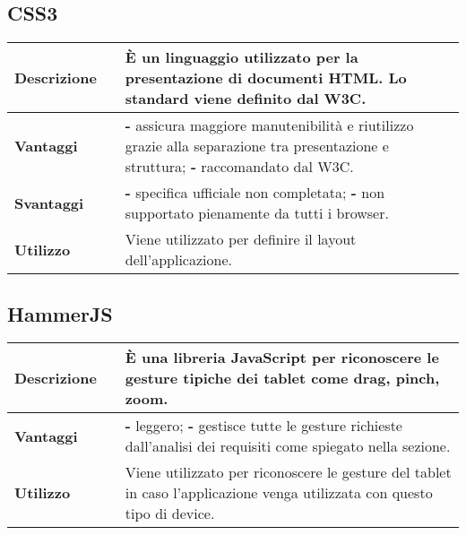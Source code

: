 \subsection{CSS3}
\label{CSS3}
\begin{table}[H]
	\centering
	\begin{tabular}{p{2cm}p{0.5cm}p{11.5cm}}
		\arrayrulecolor{lightgray}
		\toprule
		\textbf{Descrizione} & &
		È un linguaggio utilizzato per la presentazione di documenti HTML. Lo standard viene definito dal W3C.
		\\ \midrule
		\textbf{Vantaggi} & &
		\textbf{- }assicura maggiore manutenibilità e riutilizzo grazie alla separazione tra presentazione e struttura;
		\newline
		\textbf{- }raccomandato dal W3C.
		\\ \midrule
		\textbf{Svantaggi} & &
		\textbf{- }specifica ufficiale non completata;
		\newline
		\textbf{- }non supportato pienamente da tutti i browser.
		\\ \midrule
		\textbf{Utilizzo} & &
		Viene utilizzato per definire il layout dell'applicazione.
		\\ \bottomrule
	\end{tabular}
\end{table}


\newpage
\subsection{HammerJS}
\label{HammerJS}
\begin{table}[H]
	\centering
	\begin{tabular}{p{2cm}p{0.5cm}p{11.5cm}}
		\arrayrulecolor{lightgray}
		\toprule
		\textbf{Descrizione} & &
		È una libreria JavaScript per riconoscere le gesture tipiche dei tablet come drag, pinch, zoom.
		\\ \midrule
		\textbf{Vantaggi} & &
		\textbf{- }leggero;
		\newline
		\textbf{- }gestisce tutte le gesture richieste dall'analisi dei requisiti come spiegato nella sezione.
		\\ \midrule
		\textbf{Utilizzo} & &
		Viene utilizzato per riconoscere le gesture del tablet in caso l'applicazione venga utilizzata con questo tipo di device.
		\\ \bottomrule
	\end{tabular}
\end{table}



